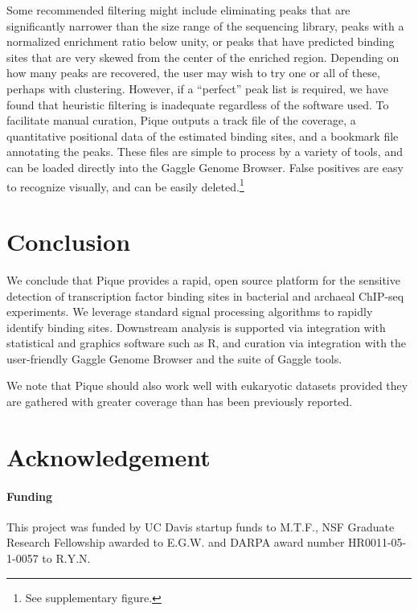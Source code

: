 \documentclass{bioinfo}
\begin{document}
Some recommended filtering might include eliminating peaks that are
significantly narrower than the size range of the sequencing library,
peaks with a normalized enrichment ratio below unity, or peaks that
have predicted binding sites that are very skewed from the center of
the enriched region. Depending on how many peaks are recovered, the
user may wish to try one or all of these, perhaps with
clustering. However, if a ``perfect'' peak list is required, we have
found that heuristic filtering is inadequate regardless of the
software used. To facilitate manual curation, Pique outputs a track
file of the coverage, a quantitative positional data of the estimated
binding sites, and a bookmark file annotating the peaks. These files
are simple to process by a variety of tools, and can be loaded
directly into the Gaggle Genome Browser. False positives are easy to
recognize visually, and can be easily deleted.\footnote{See
  supplementary figure.}

\section{Conclusion}

We conclude that Pique provides a rapid, open source platform for the
sensitive detection of transcription factor binding sites in bacterial
and archaeal ChIP-seq experiments. We leverage standard signal
processing algorithms to rapidly identify binding sites. Downstream
analysis is supported via integration with statistical and graphics
software such as R, and curation via integration with the
user-friendly Gaggle Genome Browser and the suite of Gaggle tools.

We note that Pique should also work well with eukaryotic datasets
provided they are gathered with greater coverage than has been
previously reported.

\section*{Acknowledgement}
\paragraph{Funding\textcolon} 

This project was funded by UC Davis startup funds to M.T.F., NSF Graduate
Research Fellowship awarded to E.G.W. and DARPA award number
HR0011-05-1-0057 to R.Y.N.

%
%
%
%
%




\end{document}
